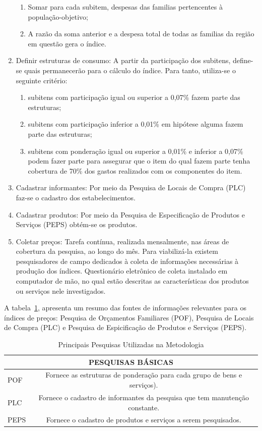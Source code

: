 \documentclass[twoside,a4paper,11pt]{report}
\begin{document}
\begin{enumerate}
\begin{enumerate}
    \item Somar para cada subitem, despesas das familias pertencentes à população-objetivo;
    \item A razão da soma anterior e a despesa total de todas as familias da região em questão gera o índice.
  \end{enumerate}
  \item Definir estruturas de consumo: A partir da participação dos subitens, define-se quais permanecerão para o cálculo do índice. Para tanto, utiliza-se o seguinte critério:
    \begin{enumerate}
    \item subitens com participação igual ou superior a 0,07\% fazem parte das estruturas;
    \item subitens com participação inferior a 0,01\% em hipótese alguma fazem parte das estruturas;
    \item subitens com ponderação igual ou superior a 0,01\% e inferior a 0,07\% podem fazer parte para assegurar que o item do qual fazem parte tenha cobertura de 70\% dos gastos realizados com os componentes do item.
    \end{enumerate}
  \item Cadastrar informantes: Por meio da Pesquisa de Locais de Compra (PLC) faz-se o cadastro dos estabelecimentos.
  \item Cadastrar produtos: Por meio da Pesquisa de Especificação de Produtos e Serviços (PEPS) obtém-se os produtos.
  \item Coletar preços: Tarefa contínua, realizada mensalmente, nas áreas de cobertura da pesquisa, ao longo do mês. Para viabilizá-la existem pesquisadores de campo dedicados à coleta de informações necessárias à produção dos índices. Questionário eletrônico de coleta instalado em computador de mão, no qual estão descritas as características dos produtos ou serviços nele investigados.
\end{enumerate}

A tabela~\ref{table:01}, apresenta um resumo das fontes de informações relevantes para os índices de preços: Pesquisa de Orçamentos Familiares (POF), Pesquisa de Locais de Compra (PLC) e Pesquisa de Espicificação de Produtos e Serviços (PEPS).

\begin{table}[h]
\centering
\begin{tabular}{lc}
\hline
\multicolumn{2}{c}{PESQUISAS BÁSICAS}                                            \\ \hline
POF & Fornece as estruturas de ponderação para cada grupo de bens e serviços).   \\
PLC & Fornece o cadastro de informantes da pesquisa que tem manutenção constante.\\ 
PEPS & Fornece o cadastro de produtos e serviços a serem pesquisados.            \\ \hline
\end{tabular}
\caption{Principais Pesquisas Utilizadas na Metodologia}
\label{table:01}
\end{table}
\end{document}
